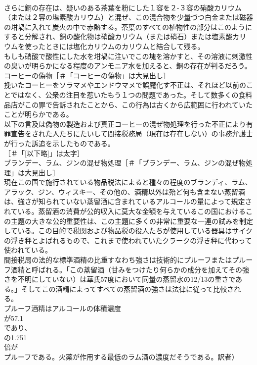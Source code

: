 \documentclass[8pt]{extreport}
\begin{document}
\begin{CJK}{UTF8}{min}
\\	さらに銅の存在は、疑いのある茶葉を粉にした１容を２-３容の硝酸カリウム（または２容の塩素酸カリウム）と混ぜ、この混合物を少量づつ白金または磁器の坩堝に入れて炭火の中で赤熱する。茶葉のすべての植物性の部分はこのようにすると分解され、銅の酸化物は硝酸カリウム（または硝石）または塩素酸カリウムを使ったときには塩化カリウムのカリウムと結合して残る。
\\	もしも硝酸で酸性にした水を坩堝に注いでこの塊を溶かすと、その溶液に刺激性の臭いが明らかになる程度のアンモニア水を加えると、銅の存在が判るだろう。
\\	コーヒーの偽物［＃「コーヒーの偽物」は大見出し］
\\	挽いたコーヒーをソラマメやエンドウマメで誤魔化す不正は、それほど以前のことではなく、公衆の注目を惹いたもう１つの問題であった。そして数多くの食料品店がこの罪で告訴されたことから、この行為は古くから広範囲に行われていたことが明らかである。
\\	以下の言及は偽物の製造および真正コーヒーの混ぜ物処理を行った不正により有罪宣告をされた人たちにたいして間接税務局（現在は存在しない）の事務弁護士
\\	が行った訴追を示したものである。
\\	[以下略]［＃「[以下略]」は太字］
\\	ブランデー、ラム、ジンの混ぜ物処理［＃「ブランデー、ラム、ジンの混ぜ物処理」は大見出し］
\\	現在この国で施行されている物品税法によると種々の程度のブランディ、ラム、アラック、ジン、ウィスキー、その他の、酒精以外は殆ど何も含まない蒸留酒は、強さが知られていない蒸留酒に含まれているアルコールの量によって規定されている。蒸留酒の消費が公的収入に莫大な金額を与えているこの国におけるこの主題の大きな公的重要性は、この主題に多くの非常に重要な一連の試みを制定している。この目的で税関および物品税の役人たちが使用している器具はサイクの浮き秤とよばれるもので、これまで使われていたクラークの浮き秤に代わって使われている。
\\	間接税局の法的な標準酒精の比重すなわち強さは技術的にプルーフまたはプルーフ酒精と呼ばれる。「この蒸留酒（甘みをつけたり何らかの成分を加えてその強さを不明にしていない）は華氏57度において同量の蒸留水の12/13の重さである。」そしてこの酒精によってすべての蒸留酒の強さは法律に従って比較される。
\\	プルーフ酒精はアルコールの体積濃度
\\	が57.1
\\	であり、
\\	の1.751
\\	倍が
\\	プルーフである。火薬が作用する最低のラム酒の濃度だそうである。訳者）

\end{CJK}
\end{document}
